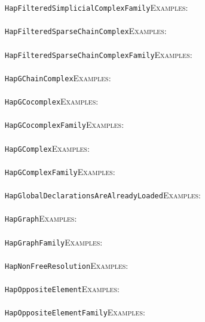 \documentclass[a4paper,11pt]{report}
\begin{document}
{{ \texttt{HapFilteredSimplicialComplexFamily}{\nobreakspace}{\nobreakspace}{\nobreakspace}{\nobreakspace}\textsc{Examples:} \\
 \\
 \texttt{HapFilteredSparseChainComplex}{\nobreakspace}{\nobreakspace}{\nobreakspace}{\nobreakspace}\textsc{Examples:} \\
 \\
 \texttt{HapFilteredSparseChainComplexFamily}{\nobreakspace}{\nobreakspace}{\nobreakspace}{\nobreakspace}\textsc{Examples:} \\
 \\
 \texttt{HapGChainComplex}{\nobreakspace}{\nobreakspace}{\nobreakspace}{\nobreakspace}\textsc{Examples:} \\
 \\
 \texttt{HapGCocomplex}{\nobreakspace}{\nobreakspace}{\nobreakspace}{\nobreakspace}\textsc{Examples:} \\
 \\
 \texttt{HapGCocomplexFamily}{\nobreakspace}{\nobreakspace}{\nobreakspace}{\nobreakspace}\textsc{Examples:} \\
 \\
 \texttt{HapGComplex}{\nobreakspace}{\nobreakspace}{\nobreakspace}{\nobreakspace}\textsc{Examples:} \\
 \\
 \texttt{HapGComplexFamily}{\nobreakspace}{\nobreakspace}{\nobreakspace}{\nobreakspace}\textsc{Examples:} \\
 \\
 \texttt{HapGlobalDeclarationsAreAlreadyLoaded}{\nobreakspace}{\nobreakspace}{\nobreakspace}{\nobreakspace}\textsc{Examples:} \\
 \\
 \texttt{HapGraph}{\nobreakspace}{\nobreakspace}{\nobreakspace}{\nobreakspace}\textsc{Examples:} \\
 \\
 \texttt{HapGraphFamily}{\nobreakspace}{\nobreakspace}{\nobreakspace}{\nobreakspace}\textsc{Examples:} \\
 \\
 \texttt{HapNonFreeResolution}{\nobreakspace}{\nobreakspace}{\nobreakspace}{\nobreakspace}\textsc{Examples:} \\
 \\
 \texttt{HapOppositeElement}{\nobreakspace}{\nobreakspace}{\nobreakspace}{\nobreakspace}\textsc{Examples:} \\
 \\
 \texttt{HapOppositeElementFamily}{\nobreakspace}{\nobreakspace}{\nobreakspace}{\nobreakspace}\textsc{Examples:} \\
}}
\end{document}
